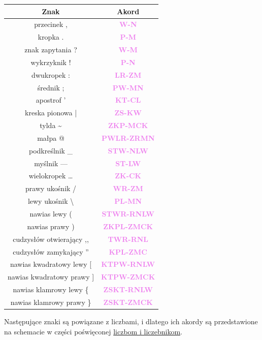 \documentclass[12p, oneside]{book}
\newcommand{\steno}[1]{\textbf{\textsf{\textcolor{violet}{ #1}}}}
\begin{document}
\begin{tabular}{| c | c |}
	\hline
	Znak & Akord \\ \hline
	przecinek , & \steno{W-N}\\ \hline
	kropka . & \steno{P-M}\\ \hline
	znak zapytania ? & \steno{W-M} \\ \hline
	wykrzyknik ! & \steno{P-N} \\ \hline
	dwukropek : & \steno{LR-ZM} \\ \hline
	średnik ; & \steno{PW-MN} \\ \hline
	apostrof ' & \steno{KT-CL} \\ \hline
	kreska pionowa | & \steno{ZS-KW} \\ \hline
	tylda \~ & \steno{ZKP-MCK} \\ \hline
	małpa @ & \steno{PWLR-ZRMN} \\ \hline
	podkreślnik \_ & \steno{STW-NLW} \\ \hline
	myślnik --- & \steno{ST-LW} \\ \hline
	wielokropek \ldots & \steno{ZK-CK} \\ \hline
	prawy ukośnik / & \steno{WR-ZM} \\ \hline
	lewy ukośnik \textbackslash & \steno{PL-MN} \\ \hline
	nawias lewy ( & \steno{STWR-RNLW} \\ \hline
	nawias prawy ) & \steno{ZKPL-ZMCK} \\ \hline
	cudzysłów otwierający ,, & \steno{TWR-RNL} \\ \hline
	cudzysłów zamykający '' & \steno{KPL-ZMC} \\ \hline
	nawias kwadratowy lewy [ & \steno{KTPW-RNLW} \\ \hline
	nawias kwadratowy prawy ] & \steno{KTPW-ZMCK} \\ \hline
	nawias klamrowy lewy \{ & \steno{ZSKT-RNLW} \\ \hline
	nawias klamrowy prawy \} & \steno{ZSKT-ZMCK} \\ \hline	
\end{tabular}

\label{znaki_liczbowe}

Następujące znaki są powiązane z liczbami, i dlatego ich akordy są 
przedstawione na schemacie w części poświęconej \hyperref[sec:liczby]{liczbom i 
liczebnikom}.
\end{document}
